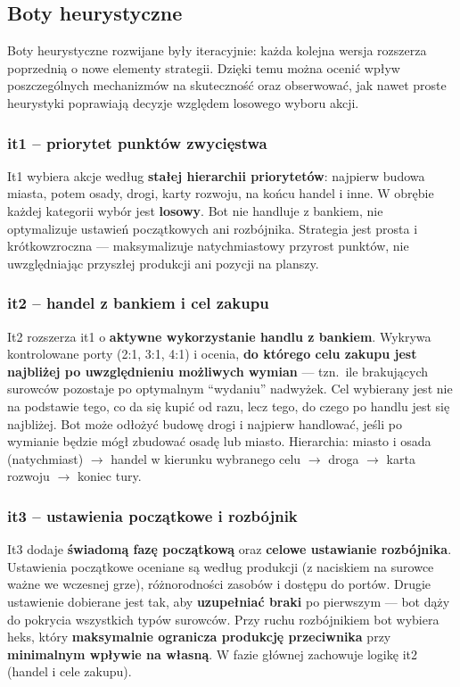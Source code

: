\subsection{Boty heurystyczne}

Boty heurystyczne rozwijane były iteracyjnie: każda kolejna wersja rozszerza poprzednią o nowe elementy strategii. Dzięki temu można ocenić wpływ poszczególnych mechanizmów na skuteczność oraz obserwować, jak nawet proste heurystyki poprawiają decyzje względem losowego wyboru akcji.

\subsubsection{it1 -- priorytet punktów zwycięstwa}

It1 wybiera akcje według \textbf{stałej hierarchii priorytetów}: najpierw budowa miasta, potem osady, drogi, karty rozwoju, na końcu handel i inne. W obrębie każdej kategorii wybór jest \textbf{losowy}. Bot nie handluje z bankiem, nie optymalizuje ustawień początkowych ani rozbójnika. Strategia jest prosta i krótkowzroczna --- maksymalizuje natychmiastowy przyrost punktów, nie uwzględniając przyszłej produkcji ani pozycji na planszy.

\subsubsection{it2 -- handel z bankiem i cel zakupu}

It2 rozszerza it1 o \textbf{aktywne wykorzystanie handlu z bankiem}. Wykrywa kontrolowane porty (2:1, 3:1, 4:1) i ocenia, \textbf{do którego celu zakupu jest najbliżej po uwzględnieniu możliwych wymian} --- tzn.\ ile brakujących surowców pozostaje po optymalnym ``wydaniu'' nadwyżek. Cel wybierany jest nie na podstawie tego, co da się kupić od razu, lecz tego, do czego po handlu jest się najbliżej. Bot może odłożyć budowę drogi i najpierw handlować, jeśli po wymianie będzie mógł zbudować osadę lub miasto. Hierarchia: miasto i osada (natychmiast) $\rightarrow$ handel w kierunku wybranego celu $\rightarrow$ droga $\rightarrow$ karta rozwoju $\rightarrow$ koniec tury.

\subsubsection{it3 -- ustawienia początkowe i rozbójnik}

It3 dodaje \textbf{świadomą fazę początkową} oraz \textbf{celowe ustawianie rozbójnika}. Ustawienia początkowe oceniane są według produkcji (z naciskiem na surowce ważne we wczesnej grze), różnorodności zasobów i dostępu do portów. Drugie ustawienie dobierane jest tak, aby \textbf{uzupełniać braki} po pierwszym --- bot dąży do pokrycia wszystkich typów surowców. Przy ruchu rozbójnikiem bot wybiera heks, który \textbf{maksymalnie ogranicza produkcję przeciwnika} przy \textbf{minimalnym wpływie na własną}. W fazie głównej zachowuje logikę it2 (handel i cele zakupu).

